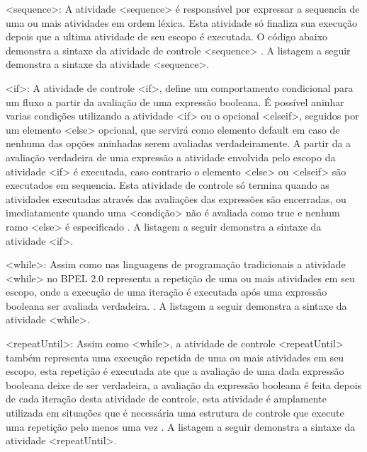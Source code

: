<sequence>: A atividade <sequence> é responsável por expressar a sequencia de uma ou mais atividades em ordem léxica. Esta atividade só finaliza sua execução depois que a ultima atividade de seu escopo é executada. O código abaixo demonstra a sintaxe da atividade de controle <sequence> \cite{BPEL20}. A listagem a seguir demonstra a sintaxe da atividade <sequence>.



<if>: A atividade de controle <if>, define um comportamento condicional para um fluxo a partir da avaliação de uma expressão booleana. É possível aninhar varias condições utilizando a atividade <if> ou o opcional <elseif>, seguidos por um elemento <else> opcional, que servirá como elemento default em caso de nenhuma das opções aninhadas serem avaliadas verdadeiramente. A partir da a avaliação verdadeira de uma expressão a atividade envolvida pelo escopo da atividade <if> é executada, caso contrario o elemento <else> ou <elseif> são executados em sequencia. Esta atividade de controle só termina quando as atividades executadas através das avaliações das expressões são encerradas, ou imediatamente quando uma <condição> não é avaliada como true e nenhum ramo <else> é especificado \cite{BPEL20}. A listagem a seguir demonstra a sintaxe da atividade <if>.



<while>: Assim como nas linguagens de programação tradicionais a atividade <while> no BPEL 2.0 representa a repetição de uma ou mais atividades em seu escopo, onde a execução de uma iteração é executada após uma expressão booleana ser avaliada verdadeira. \cite{BPEL20}. A listagem a seguir demonstra a sintaxe da atividade <while>.



<repeatUntil>: Assim como <while>, a atividade de controle <repeatUntil> também representa uma execução repetida de uma ou mais atividades em seu escopo, esta repetição é executada ate que a avaliação de uma dada expressão booleana deixe de ser verdadeira, a avaliação da expressão booleana é feita depois de cada iteração desta atividade de controle, esta atividade é amplamente utilizada em situações que é necessária uma estrutura de controle que execute uma repetição pelo menos uma vez \cite{BPEL20}. A listagem a seguir demonstra a sintaxe da atividade <repeatUntil>.

